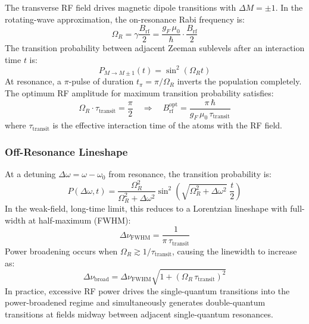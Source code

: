 The transverse RF field drives magnetic dipole transitions with $\Delta M = \pm 1$.
In the rotating-wave approximation, the on-resonance Rabi frequency is:
\begin{equation}
    \Omega_R = \gamma \frac{B_{\text{rf}}}{2}
             = \frac{g_F\,\mu_0}{\hbar}\cdot\frac{B_{\text{rf}}}{2}
\end{equation}
The transition probability between adjacent Zeeman sublevels after an interaction time
$t$ is:
\begin{equation}
    P_{M \to M\pm1}(t) = \sin^2\!\left(\Omega_R t\right)
\end{equation}
At resonance, a $\pi$-pulse of duration $t_\pi = \pi/\Omega_R$ inverts the population
completely. The optimum RF amplitude for maximum transition probability satisfies:
\begin{equation}
    \Omega_R \cdot \tau_{\text{transit}} = \frac{\pi}{2}
    \quad\Longrightarrow\quad
    B_{\text{rf}}^{\text{opt}} = \frac{\pi\,\hbar}{g_F\,\mu_0\,\tau_{\text{transit}}}
\end{equation}
where $\tau_{\text{transit}}$ is the effective interaction time of the atoms with the
RF field.
 
\subsubsection*{Off-Resonance Lineshape}
 
At a detuning $\Delta\omega = \omega - \omega_0$ from resonance, the transition
probability is:
\begin{equation}
    P(\Delta\omega, t) = \frac{\Omega_R^2}{\Omega_R^2 + \Delta\omega^2}
    \sin^2\!\left(\sqrt{\Omega_R^2 + \Delta\omega^2}\;\frac{t}{2}\right)
\end{equation}
In the weak-field, long-time limit, this reduces to a Lorentzian lineshape with
full-width at half-maximum (FWHM):
\begin{equation}
    \Delta\nu_{\text{FWHM}} = \frac{1}{\pi\,\tau_{\text{transit}}}
\end{equation}
Power broadening occurs when $\Omega_R \gtrsim 1/\tau_{\text{transit}}$, causing the
linewidth to increase as:
\begin{equation}
    \Delta\nu_{\text{broad}} = \Delta\nu_{\text{FWHM}}
    \sqrt{1 + \left(\Omega_R\,\tau_{\text{transit}}\right)^2}
\end{equation}
In practice, excessive RF power drives the single-quantum transitions into the
power-broadened regime and simultaneously generates double-quantum transitions at
fields midway between adjacent single-quantum resonances.
 
